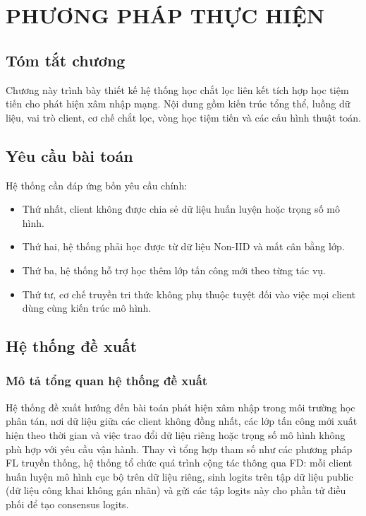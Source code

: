 \chapter{PHƯƠNG PHÁP THỰC HIỆN}\label{Chapter3}

\section*{Tóm tắt chương}

Chương này trình bày thiết kế hệ thống học chắt lọc liên kết tích hợp học tiệm tiến cho phát hiện xâm nhập mạng. Nội dung gồm kiến trúc tổng thể, luồng dữ liệu, vai trò client, cơ chế chắt lọc, vòng học tiệm tiến và các cấu hình thuật toán.

\section{Yêu cầu bài toán}

Hệ thống cần đáp ứng bốn yêu cầu chính:

\begin{itemize}
    \item Thứ nhất, client không được chia sẻ dữ liệu huấn luyện hoặc trọng số mô hình.
    \item Thứ hai, hệ thống phải học được từ dữ liệu Non-IID và mất cân bằng lớp.
    \item Thứ ba, hệ thống hỗ trợ học thêm lớp tấn công mới theo từng tác vụ.
    \item Thứ tư, cơ chế truyền tri thức không phụ thuộc tuyệt đối vào việc mọi client dùng cùng kiến trúc mô hình.
\end{itemize}

\section{Hệ thống đề xuất}

\subsection{Mô tả tổng quan hệ thống đề xuất}

Hệ thống đề xuất hướng đến bài toán phát hiện xâm nhập trong môi trường học phân tán, nơi dữ liệu giữa các client không đồng nhất, các lớp tấn công mới xuất hiện theo thời gian và việc trao đổi dữ liệu riêng hoặc trọng số mô hình không phù hợp với yêu cầu vận hành. Thay vì tổng hợp tham số như các phương pháp FL truyền thống, hệ thống tổ chức quá trình cộng tác thông qua FD: mỗi client huấn luyện mô hình cục bộ trên dữ liệu riêng, sinh logits trên tập dữ liệu public (dữ liệu công khai không gán nhãn) và gửi các tập logits này cho phần tử điều phối để tạo consensus logits.

